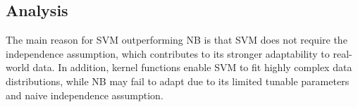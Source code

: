 \documentclass[10pt,a4paper]{article}
\begin{document}
	\subsection{Analysis}
		The main reason for SVM outperforming NB is that SVM does not require the independence assumption, which contributes to its stronger adaptability to real-world data. In addition, kernel functions enable SVM to fit highly complex data distributions, while NB may fail to adapt due to its limited tunable parameters and naive independence assumption.
\end{document}
